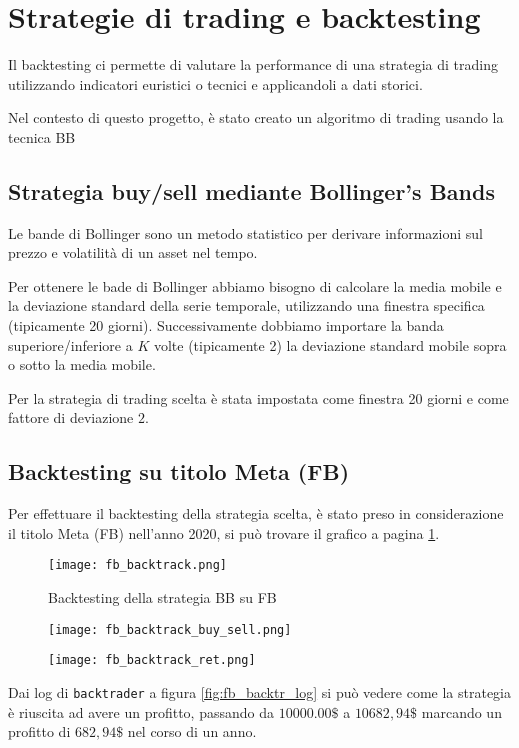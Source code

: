 
\section{Strategie di trading e backtesting}

Il backtesting ci permette di valutare la performance di una strategia di trading utilizzando
indicatori euristici o tecnici e applicandoli a dati storici.

Nel contesto di questo progetto, è stato creato un algoritmo di trading usando la tecnica BB

\subsection{Strategia buy/sell mediante Bollinger's Bands}

Le bande di Bollinger sono un metodo statistico per derivare informazioni sul prezzo e volatilità di un asset
nel tempo.

Per ottenere le bade di Bollinger abbiamo bisogno di calcolare la media mobile e la deviazione standard della serie
temporale, utilizzando una finestra specifica (tipicamente 20 giorni). Successivamente dobbiamo importare la banda
superiore/inferiore a $K$ volte (tipicamente 2) la deviazione standard mobile sopra o sotto la media mobile.

Per la strategia di trading scelta è stata impostata come finestra 20 giorni e come fattore di deviazione $2$.

\pagebreak

\subsection{Backtesting su titolo Meta (FB)}

Per effettuare il backtesting della strategia scelta, è stato preso in considerazione il titolo Meta (FB) nell'anno
2020, si può trovare il grafico a pagina \ref{fig:fb_backtest}.

\begin{figure}[ht]
    \centering
    \texttt{[image: fb\_backtrack.png]}
    \caption{Backtesting della strategia BB su FB}
    \label{fig:fb_backtest}
\end{figure}

\begin{figure}[ht]
    \centering
    \begin{minipage}{.6\textwidth}
        \centering
        \vspace{1.27cm}
        \texttt{[image: fb\_backtrack\_buy\_sell.png]}
        \label{fig:fb_backtr_log}
    \end{minipage}%
    \begin{minipage}{.4\textwidth}
        \centering
        \texttt{[image: fb\_backtrack\_ret.png]}
        \label{fig:fb_backtr_ret}
    \end{minipage}
\end{figure}

Dai log di \verb|backtrader| a figura \ref{fig:fb_backtr_log} si può vedere come la strategia è riuscita ad avere un profitto,
passando da $10000.00\$$ a $10682,94\$$ marcando un profitto di $682,94\$$ nel corso di un anno.